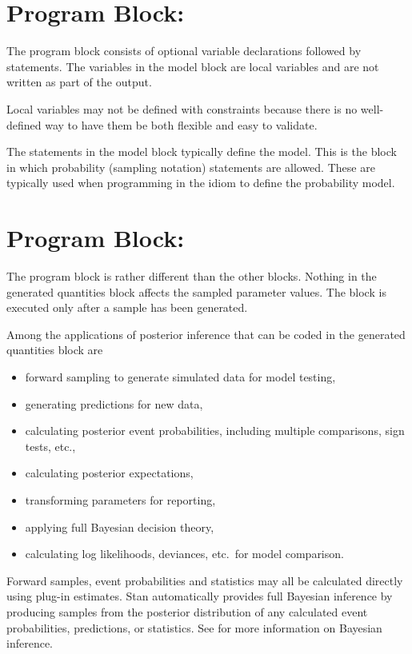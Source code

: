 \section{Program Block: }

The  program block consists of optional variable
declarations followed by statements.  The variables in the model block
are local variables and are not written as part of the output.

Local variables may not be defined with constraints because there is
no well-defined way to have them be both flexible and easy to
validate.

The statements in the model block typically define the model.  This is
the block in which probability (sampling notation) statements are
allowed.  These are typically used when programming in the \BUGS idiom
to define the probability model.


\section{Program Block: }

The  program block is rather different than
the other blocks.  Nothing in the generated quantities block affects
the sampled parameter values.  The block is executed only after a
sample has been generated.

Among the applications of posterior inference that can be coded in the
generated quantities block are
%
\begin{itemize}
\item forward sampling to generate simulated data for model testing,
\item generating predictions for new data,
\item calculating posterior event probabilities, including multiple comparisons,
  sign tests, etc.,
\item calculating posterior expectations,
\item transforming parameters for reporting,
\item applying full Bayesian decision theory,
\item calculating log likelihoods, deviances, etc.\ for model comparison.
\end{itemize}
%
Forward samples, event probabilities and statistics may all be
calculated directly using plug-in estimates.  Stan automatically
provides full Bayesian inference by producing samples from the
posterior distribution of any calculated event probabilities,
predictions, or statistics.  See  for more
information on Bayesian inference.

